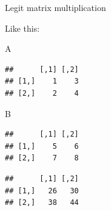 \documentclass[ignorenonframetext,]{beamer}
\newenvironment{Shaded}{\begin{snugshade}}{\end{snugshade}}
\newcommand{\NormalTok}[1]{#1}
\newcommand{\OperatorTok}[1]{\textcolor[rgb]{0.81,0.36,0.00}{\textbf{#1}}}
\newcommand{\StringTok}[1]{\textcolor[rgb]{0.31,0.60,0.02}{#1}}
\begin{document}
\begin{frame}[fragile]{Legit matrix multiplication}
\protect\hypertarget{legit-matrix-multiplication}{}

Like this:

\begin{Shaded}
\begin{Highlighting}[]
\NormalTok{A}
\end{Highlighting}
\end{Shaded}

\begin{verbatim}
##      [,1] [,2]
## [1,]    1    3
## [2,]    2    4
\end{verbatim}

\begin{Shaded}
\begin{Highlighting}[]
\NormalTok{B}
\end{Highlighting}
\end{Shaded}

\begin{verbatim}
##      [,1] [,2]
## [1,]    5    6
## [2,]    7    8
\end{verbatim}

\begin{Shaded}
\end{Shaded}

\begin{verbatim}
##      [,1] [,2]
## [1,]   26   30
## [2,]   38   44
\end{verbatim}

\end{frame}
\end{document}
